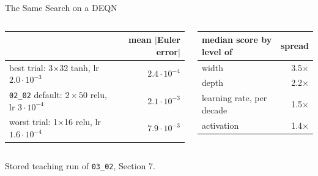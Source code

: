 \documentclass[aspectratio=169,11pt]{beamer}
\begin{document}
\begin{frame}{The Same Search on a DEQN}
\vspace{0.1cm}
\begin{columns}[T]
\begin{center}
\renewcommand{\arraystretch}{1.1}
{\scriptsize
\begin{tabular}{@{}lr@{}}
\toprule
 & mean $|$Euler error$|$ \\
\midrule
best trial: 3$\times$32 tanh, lr $2.0\cdot10^{-3}$ & $2.4\cdot10^{-4}$ \\
\texttt{02\_02} default: $2{\times}50$ relu, lr $3{\cdot}10^{-4}$ & $2.1\cdot10^{-3}$ \\
worst trial: 1$\times$16 relu, lr $1.6\cdot10^{-4}$ & $7.9\cdot10^{-3}$ \\
\bottomrule
\end{tabular}}
\end{center}
\begin{center}
\renewcommand{\arraystretch}{1.1}
{\scriptsize
\begin{tabular}{@{}lr@{}}
\toprule
median score by level of & spread \\
\midrule
width & 3.5$\times$ \\
depth & 2.2$\times$ \\
learning rate, per decade & 1.5$\times$ \\
activation & 1.4$\times$ \\
\bottomrule
\end{tabular}}
\end{center}
\end{columns}
\vspace{0.05cm}
{\scriptsize Stored teaching run of \texttt{03\_02}, Section 7.}
\end{frame}
\end{document}
